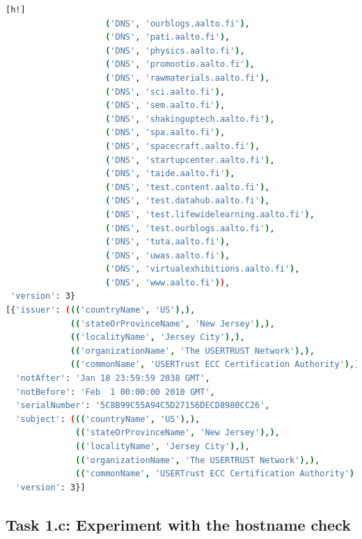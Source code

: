 \begin{lstlisting}[language=bash, caption= A TLS handshake connecting to
    \url{www.aalto.fi}., label={lst:handshake_aalto}][h!]
                    ('DNS', 'ourblogs.aalto.fi'),
                    ('DNS', 'pati.aalto.fi'),
                    ('DNS', 'physics.aalto.fi'),
                    ('DNS', 'promootio.aalto.fi'),
                    ('DNS', 'rawmaterials.aalto.fi'),
                    ('DNS', 'sci.aalto.fi'),
                    ('DNS', 'sem.aalto.fi'),
                    ('DNS', 'shakinguptech.aalto.fi'),
                    ('DNS', 'spa.aalto.fi'),
                    ('DNS', 'spacecraft.aalto.fi'),
                    ('DNS', 'startupcenter.aalto.fi'),
                    ('DNS', 'taide.aalto.fi'),
                    ('DNS', 'test.content.aalto.fi'),
                    ('DNS', 'test.datahub.aalto.fi'),
                    ('DNS', 'test.lifewidelearning.aalto.fi'),
                    ('DNS', 'test.ourblogs.aalto.fi'),
                    ('DNS', 'tuta.aalto.fi'),
                    ('DNS', 'uwas.aalto.fi'),
                    ('DNS', 'virtualexhibitions.aalto.fi'),
                    ('DNS', 'www.aalto.fi')),
 'version': 3}
[{'issuer': ((('countryName', 'US'),),
             (('stateOrProvinceName', 'New Jersey'),),
             (('localityName', 'Jersey City'),),
             (('organizationName', 'The USERTRUST Network'),),
             (('commonName', 'USERTrust ECC Certification Authority'),)),
  'notAfter': 'Jan 18 23:59:59 2038 GMT',
  'notBefore': 'Feb  1 00:00:00 2010 GMT',
  'serialNumber': '5C8B99C55A94C5D27156DECD8980CC26',
  'subject': ((('countryName', 'US'),),
              (('stateOrProvinceName', 'New Jersey'),),
              (('localityName', 'Jersey City'),),
              (('organizationName', 'The USERTRUST Network'),),
              (('commonName', 'USERTrust ECC Certification Authority'),)),
  'version': 3}]

\end{lstlisting}

\subsection{Task 1.c: Experiment with the hostname check}

